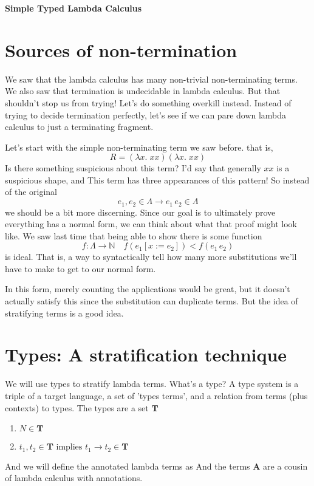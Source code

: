 \documentclass[12pt]{article}
\begin{document}
\baselineskip 12pt

\begin{center}
\textbf{\Large Simple Typed Lambda Calculus} \\
\end{center}

\section{Sources of non-termination}
We saw that the lambda calculus has many non-trivial non-terminating terms. 
We also saw that termination is undecidable in lambda calculus.
But that shouldn't stop us from trying!
Let's do something overkill instead.
Instead of trying to decide termination perfectly, let's see if we can pare down lambda calculus to just a terminating fragment.

Let's start with the simple non-terminating term we saw before.
that is,
\[
  R = (\lambda x.\; xx)(\lambda x.\; xx)
\]
Is there something suspicious about this term?
I'd say that generally $xx$ is a suspicious shape, and
This term has three appearances of this pattern! 
So instead of the original 
\[
  e_1, e_2 \in \Lambda \rightarrow e_1 \, e_2 \in \Lambda
\]
we should be a bit more discerning.
Since our goal is to ultimately prove everything has a normal form, we can think about what that proof might look like.
We saw last time that being able to show there is some function 
\[
  f : \Lambda \rightarrow \mathbb{N}\quad f(e_1[x:=e_2]) < f(e_1 \, e_2)
\]
is ideal.
That is, a way to syntactically tell how many more substitutions we'll have to make to get to our normal form.

In this form, merely counting the applications would be great, but it doesn't actually satisfy this since the substitution can duplicate terms.
But the idea of stratifying terms is a good idea.

\section{Types: A stratification technique}
We will use types to stratify lambda terms.
What's a type? 
A type system is a triple of a target language, a set of 'types terms', and a relation from terms (plus contexts) to types.
The types are a set $\mathbf{T}$
\begin{enumerate}
    \item $N \in \mathbf{T}$
    \item $t_1, t_2 \in \mathbf{T} \text{ implies } t_1 \rightarrow t_2 \in \mathbf{T}$
\end{enumerate}
And we will define the annotated lambda terms as
And the terms $\mathbf{A}$ are a cousin of lambda calculus with annotations.
\end{document}
